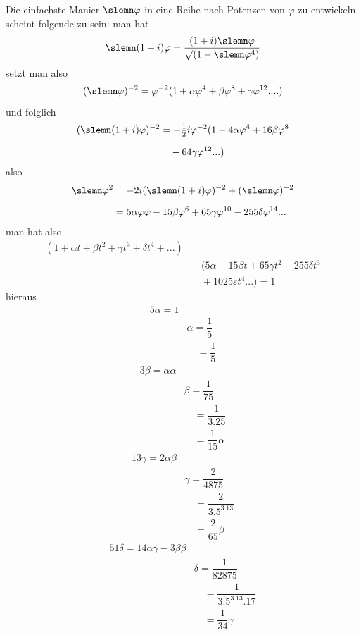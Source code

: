 Die einfachste Manier $\slemn\varphi$ in eine Reihe nach Potenzen von $\varphi$ zu entwickeln scheint folgende zu sein: man hat
\[
\slemn(1+i)\varphi=\dfrac{(1+i)\slemn\varphi}{\surd(1-\slemn\varphi^4)}
\]
setzt man also
\[
(\slemn\varphi)^{-2}=\varphi^{-2}(1+\alpha\varphi^4+\beta\varphi^8+\gamma\varphi^{12}\mathord{.}\mathord{.}\mathord{.}\mathord{.})
\]
und folglich
\[
\begin{aligned}(\slemn(1+i)\varphi)^{-2}&=-\tfrac12i\varphi^{-2}(1-4\alpha\varphi^4+16\beta\varphi^8\\[6pt]&\quad{}-64\gamma\varphi^{12}\mathord{.}\mathord{.}\mathord{.})\end{aligned}
\]
also
\[
\begin{aligned}
\slemn\varphi^2&=-2i(\slemn(1+i)\varphi)^{-2}+(\slemn\varphi)^{-2}\\[6pt]
&=5\alpha\varphi\varphi-15\beta\varphi^6+65\gamma\varphi^{10}-255\delta\varphi^{14}\mathord{.}\mathord{.}\mathord{.}
\end{aligned}
\]
man hat also
\[
\begin{aligned}(1+\alpha t+\beta t^2+\gamma t^3+\delta t^4+\mathord{.}\mathord{.}\mathord{.})\\[6pt]&\quad(5\alpha-15\beta t+65\gamma t^2-255\delta t^3\\[5pt]&\quad{}+1025\varepsilon t^4\mathord{.}\mathord{.}\mathord{.})=1\end{aligned}
\]
hieraus
\[
\begin{aligned}5\alpha=1\\[5pt]&\alpha=\dfrac15\\[5pt]&\quad=\dfrac15\end{aligned}
\]
\[
\begin{aligned}3\beta=\alpha\alpha\\[5pt]&\beta=\dfrac1{75}\\[5pt]&\quad=\dfrac1{3.25}\\[5pt]&\quad=\dfrac1{15}\alpha\end{aligned}
\]
\[
\begin{aligned}13\gamma=2\alpha\beta\\[5pt]&\gamma=\dfrac2{4875}\\[5pt]&\quad=\dfrac2{3.5^3.13}\\[5pt]&\quad=\dfrac2{65}\beta\end{aligned}
\]
\[
\begin{aligned}51\delta=14\alpha\gamma-3\beta\beta\\[5pt]&\delta=\dfrac1{82875}\\[5pt]&\quad=\dfrac1{3.5^3.13.17}\\[5pt]&\quad=\dfrac1{34}\gamma\end{aligned}
\]

